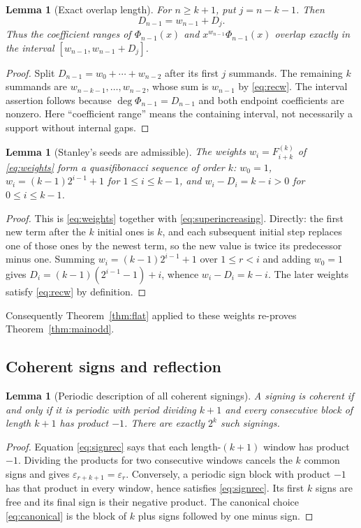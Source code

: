 \documentclass[11pt,letterpaper]{article}
\numberwithin{equation}{section}
\newtheorem{lemma}[theorem]{Lemma}
\theoremstyle{definition}
\theoremstyle{remark}
\newcommand{\eps}{\varepsilon}
\begin{document}
\begin{lemma}[Exact overlap length]
\label{lem:overlap-length}
For $n\ge k+1$, put $j=n-k-1$. Then
\begin{equation}
 D_{n-1}=w_{n-1}+D_j.
 \label{eq:overlaplength}
\end{equation}
Thus the coefficient ranges of $\Phi_{n-1}(x)$ and
$x^{w_{n-1}}\Phi_{n-1}(x)$ overlap exactly in the interval
$[w_{n-1},w_{n-1}+D_j]$.
\end{lemma}
\begin{proof}
Split $D_{n-1}=w_0+\cdots+w_{n-2}$ after its first $j$ summands. The
remaining $k$ summands are $w_{n-k-1},\ldots,w_{n-2}$, whose sum is
$w_{n-1}$ by \eqref{eq:recw}. The interval assertion follows because
$\deg\Phi_{n-1}=D_{n-1}$ and both endpoint coefficients are nonzero.
Here ``coefficient range'' means the containing interval, not necessarily a
support without internal gaps.
\end{proof}

\begin{lemma}[Stanley's seeds are admissible]
\label{lem:originalseeds}
The weights $w_i=F^{(k)}_{i+k}$ of \eqref{eq:weights} form a
quasifibonacci sequence of order $k$: $w_0=1$,
$w_i=(k-1)2^{i-1}+1$ for $1\le i\le k-1$, and
$w_i-D_i=k-i>0$ for $0\le i\le k-1$.
\end{lemma}
\begin{proof}
This is \eqref{eq:weights} together with \eqref{eq:superincreasing}.
Directly: the first new term after the $k$ initial ones is $k$, and each
subsequent initial step replaces one of those ones by the newest term, so
the new value is twice its predecessor minus one. Summing
$w_i=(k-1)2^{i-1}+1$ over $1\le r<i$ and adding $w_0=1$ gives
$D_i=(k-1)(2^{i-1}-1)+i$, whence $w_i-D_i=k-i$. The later weights satisfy
\eqref{eq:recw} by definition.
\end{proof}

Consequently Theorem~\ref{thm:flat} applied to these weights re-proves
Theorem~\ref{thm:mainodd}.

\subsection{Coherent signs and reflection}

\begin{lemma}[Periodic description of all coherent signings]
\label{lem:period}
A signing is coherent if and only if it is periodic with period dividing
$k+1$ and every consecutive block of length $k+1$ has product $-1$.
There are exactly $2^k$ such signings.
\end{lemma}
\begin{proof}
Equation \eqref{eq:signrec} says that each length-$(k+1)$ window has product
$-1$. Dividing the products for two consecutive windows cancels the $k$
common signs and gives $\eps_{r+k+1}=\eps_r$. Conversely, a periodic sign
block with product $-1$ has that product in every window, hence satisfies
\eqref{eq:signrec}. Its first $k$ signs are free and its final sign is their
negative product. The canonical choice \eqref{eq:canonical} is the block of
$k$ plus signs followed by one minus sign.
\end{proof}
\end{document}
